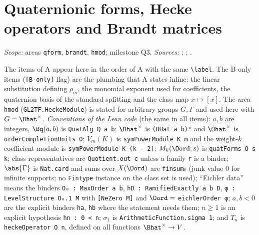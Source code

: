 
\chapter{Quaternionic forms, Hecke operators and Brandt matrices}\label{ch:ch-iii-08-brandt}

\noindent\emph{Scope:} areas \texttt{qform}, \texttt{brandt}, \texttt{hmod}; milestone Q3. \emph{Sources:} \cite[§§1--2, pp.~169--173]{Shz};
\cite[Def.~2.13, p.~353; Lemma~2.18, p.~356; Prop.~2.22, p.~358]{Piz}; \cite[Ch.~41]{Voi}.

\noindent The items of A appear here in the order of A with the same \texttt{\textbackslash label}. The B-only items (\texttt{[B-only]} flag) are the plumbing that A states inline: the linear substitution
defining $\rho_m$, the monomial exponent used for coefficients, the quaternion basis of the standard splitting and the class map $x\mapsto[x]$. The area \texttt{hmod} (\texttt{GL2TF.HeckeModule}) is stated for
arbitrary groups $G,\Gamma$ and used here with $G=\Bhat^\times$. \emph{Conventions of the Lean code} (the same in all items): $a,b$ are integers, $\Bq(a,b)$ is \texttt{QuatAlg ℚ a b}; $\Bhat^\times$ is \texttt{(BHat a b)ˣ}
and $\Ohat^\times$ is \texttt{orderCompletionUnits O}; $V_m(K)$ is \texttt{symPowerModule K m} and the weight-$k$ coefficient module is \texttt{symPowerModule K (k - 2)}; $M_k(\Oord;s)$ is \texttt{quatForms O s k};
class representatives are \texttt{Quotient.out c} unless a family \texttt{r} is a binder; $\abs{\Gamma}$ is \texttt{Nat.card} and sums over $X(\Oord)$ are \texttt{finsum}s (junk value $0$ for infinite supports; no \texttt{Fintype}
instance on the class set is used); ``Eichler data'' means the binders \texttt{O₀ : MaxOrder a b}, \texttt{hD : RamifiedExactly a b D}, \texttt{φ : LevelStructure O₀.1 M} with \texttt{[NeZero M]} and $\Oord=$ \texttt{eichlerOrder φ};
$a,b<0$ are the explicit binders \texttt{ha}, \texttt{hb} where the statement needs them; $n\ge1$ is an explicit hypothesis \texttt{hn : 0 < n}; $\sigma_1$ is \texttt{ArithmeticFunction.sigma 1}; and $T_n$ is
\texttt{heckeOperator O n}, defined on all functions $\Bhat^\times\to V$.

